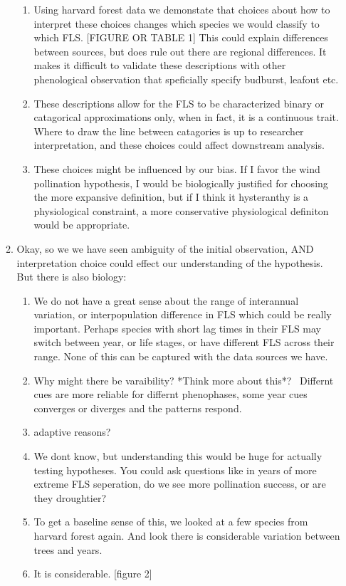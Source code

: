 \documentclass{article}
\begin{document}
\begin{enumerate}
\begin{enumerate}
\begin{enumerate}
\item Using harvard forest data we demonstate that choices about how to interpret these choices changes which species we would classify to which FLS. [FIGURE OR TABLE 1] This could explain differences between sources, but does rule out there are regional differences. It makes it difficult to validate these descriptions with other phenological observation that speficially specify budburst, leafout etc.
\item These descriptions allow for the FLS to be characterized binary or catagorical approximations only, when in fact, it is a continuous trait. Where to draw the line between catagories is up to researcher interpretation, and these choices could affect downstream analysis.
\item These choices might be influenced by our bias. If I favor the wind pollination hypothesis, I would be biologically justified for choosing the more expansive definition, but if I think it hysteranthy is a physiological constraint, a more conservative physiological definiton would be appropriate.
\end{enumerate}
\item Okay, so we we have seen ambiguity of the initial observation, AND interpretation choice could effect our understanding of the hypothesis. But there is also biology:
\begin{enumerate}
\item We do not have a great sense about the range of interannual variation, or interpopulation difference in FLS which could be really important. Perhaps species with short lag times in their FLS may switch between year, or life stages, or have different FLS across their range. None of this can be captured with the data sources we have.
\item Why might there be varaibility? *Think more about this*?
\ Differnt cues are more reliable for differnt phenophases, some year cues converges or diverges and the patterns respond.
\item adaptive reasons?
\item We dont know, but understanding this would be huge for actually testing hypotheses. You could ask questions like in years of more extreme FLS seperation, do we see more pollination success, or are they droughtier?
\item To get a baseline sense of this, we looked at a few species from harvard forest again. And look there is considerable variation between trees and years.
\item It is considerable. [figure 2]

\end{enumerate}
\end{enumerate}
\end{enumerate}
\end{document}
